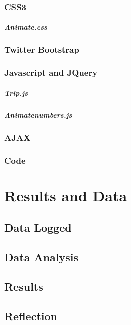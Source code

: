 \documentclass{mproj}
\begin{document}
\subsection{CSS3}
\paragraph{Animate.css}
\subsection{Twitter Bootstrap}
\label{subsec: boot}
\subsection{Javascript and JQuery}
\paragraph{Trip.js}
\paragraph{Animatenumbers.js}
\subsection{AJAX}
\label{subsec:AJAX}
\subsection{Code}


\chapter{Results and Data}\label{results}
\section{Data Logged}
\section{Data Analysis}
\section{Results}
\section{Reflection}
\end{document}
